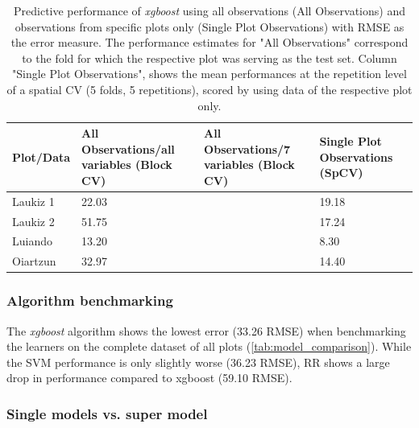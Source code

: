 \documentclass[review]{elsarticle}
\begin{document}
\begin{table}[t!]
\centering
\caption[t]{Predictive performance of \textit{xgboost} using all observations (All Observations) and observations from specific plots only (Single Plot Observations) with \ac{RMSE} as the error measure. The performance estimates for "All Observations" correspond to the fold for which the respective plot was serving as the test set. Column "Single Plot Observations", shows the mean performances at the repetition level of a spatial CV (5 folds, 5 repetitions), scored by using data of the respective plot only.}
\begingroup\footnotesize
\begin{tabular}{llll}
	\\
	Plot/Data & All Observations/all variables (Block CV) & All Observations/7 variables (Block CV) & Single Plot Observations (SpCV) \\
	\hline
	Laukiz 1  & 22.03                                     &                                         & 19.18                           \\
	Laukiz 2  & 51.75                                     &                                         & 17.24                           \\
	Luiando   & 13.20                                     &                                         & 8.30                            \\
	Oiartzun  & 32.97                                     &                                         & 14.40                           \\
	\bottomrule
\end{tabular}
\endgroup
\label{tab:supermodel_performance}
\end{table}

\subsubsection{Algorithm benchmarking}

The \textit{xgboost} algorithm shows the lowest error (33.26 RMSE) when benchmarking the learners on the complete dataset of all plots (\autoref{tab:model_comparison}).
While the SVM performance is only slightly worse (36.23 RMSE), RR shows a large drop in performance compared to xgboost (59.10 RMSE).

\subsubsection{Single models vs. super model}
\end{document}
